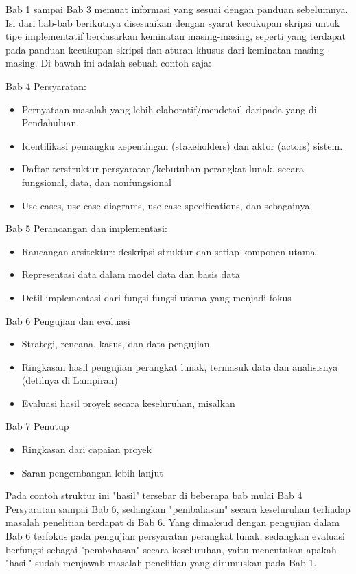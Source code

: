 Bab 1 sampai Bab 3 memuat informasi yang sesuai dengan panduan sebelumnya. Isi dari bab-bab berikutnya disesuaikan dengan syarat kecukupan skripsi untuk tipe implementatif berdasarkan keminatan masing-masing, seperti yang terdapat pada panduan kecukupan skripsi dan aturan khusus dari keminatan masing-masing. Di bawah ini adalah sebuah contoh saja: 

\begin{displayquote}
  Bab 4 Persyaratan:
  \begin{itemize}
    \item Pernyataan masalah yang lebih elaboratif/mendetail daripada yang di Pendahuluan.
    \item Identifikasi pemangku kepentingan (stakeholders) dan aktor (actors) sistem.
    \item Daftar terstruktur persyaratan/kebutuhan perangkat lunak, secara fungsional, data, dan nonfungsional
    \item Use cases, use case diagrams, use case specifications, dan sebagainya. 
  \end{itemize} 
  Bab 5 Perancangan dan implementasi:
  \begin{itemize}
    \item Rancangan arsitektur: deskripsi struktur dan setiap komponen utama
    \item Representasi data dalam model data dan basis data
    \item Detil implementasi dari fungsi-fungsi utama yang menjadi fokus
  \end{itemize}
  Bab 6 Pengujian dan evaluasi
  \begin{itemize}
    \item Strategi, rencana, kasus, dan data pengujian
    \item Ringkasan hasil pengujian perangkat lunak, termasuk data dan analisisnya (detilnya di Lampiran)
    \item Evaluasi hasil proyek secara keseluruhan, misalkan 
  \end{itemize}
  Bab 7 Penutup
  \begin{itemize}
    \item Ringkasan dari capaian proyek
    \item Saran pengembangan lebih lanjut
  \end{itemize}
\end{displayquote}

Pada contoh struktur ini "hasil" tersebar di beberapa bab mulai Bab 4 Persyaratan sampai Bab 6, sedangkan "pembahasan" secara keseluruhan terhadap masalah penelitian terdapat di Bab 6. Yang dimaksud dengan pengujian dalam Bab 6 terfokus pada pengujian persyaratan perangkat lunak, sedangkan evaluasi berfungsi sebagai "pembahasan" secara keseluruhan, yaitu menentukan apakah "hasil" sudah menjawab masalah penelitian yang dirumuskan pada Bab 1. 

